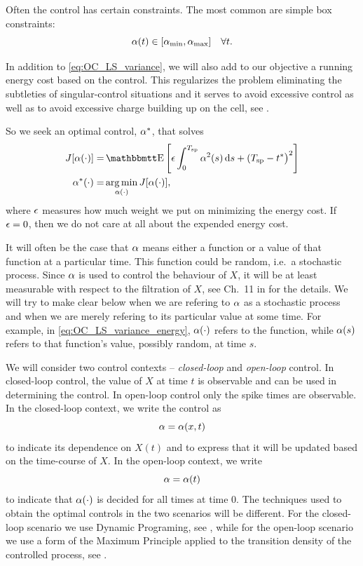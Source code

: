 \documentclass[12pt]{iopart}
\begin{document}
Often the control has certain constraints. The most common are simple box
constraints:
\begin{equation}
{\alpha}(t) \in [{ {\alpha}_{\textrm{min}} }, { {\alpha}_{\textrm{max}} }] \quad \forall t.
\label{eq:bound_constraints_alpha}
\end{equation}

In addition to \cref{eq:OC_LS_variance}, we will also add to our objective a
running energy cost based on the control. This regularizes the problem
eliminating the subtleties of singular-control situations and it serves to avoid excessive
control as well as to avoid excessive charge building up on the cell, see
\cite{Ahmadian2011}. 

So we seek an optimal control, ${\alpha}^*$, that solves
\begin{align}
J[\a(\cdot)] =&
\Exp\left[
\e \int_0^\ts  \a^2(s) \intd{s}
+
(\ts - \T \big)^2 \right]
\label{eq:OC_LS_variance_energy}
\\ \notag
\a^*(\cdot) =& \argmin_{\a(\cdot)} J[\a(\cdot)],
\end{align}
where ${\epsilon}$ measures how much weight we put on minimizing the energy cost.
If ${\epsilon} = 0$, then we do not care at all about the expended energy cost.

It will often be the case that ${\alpha}$ means either a function or a
value of that function at a particular time. This function could be
random, i.e.\ a stochastic process. Since ${\alpha}$ is used to control the behaviour
of $X$, it will be at least measurable with respect to the filtration of $X$,
see Ch.\ 11 in \cite{Oksendal2007} for the details. We will try to make clear
below when we are refering to ${\alpha}$ as a stochastic process and when we are merely refering to its particular
value at some time. For example, in \cref{eq:OC_LS_variance_energy}, ${\alpha}(\cdot)$
refers to the function, while ${\alpha}(s)$ refers to that function's value, possibly
random, at time $s$.

We will consider two control contexts -- {\sl closed-loop} and  {\sl open-loop}
control. In closed-loop control, the value of $X$ at time $t$ is observable
and can be used in determining the control. In open-loop control only the spike
times are observable. In the closed-loop context, we write the control as $${\alpha} =
{\alpha}(x,t)$$ to indicate its dependence on $X(t)$ and to express that it will be
updated based on the time-course of $X$. In the open-loop context, we write $${\alpha}
= {\alpha}(t)$$ to indicate that ${\alpha}(\cdot)$ is decided for all times at time 0. The
techniques used to obtain the optimal controls in the two scenarios will be
different. For the closed-loop scenario we use Dynamic Programing,
see \cite{Fleming1975}, while for the open-loop scenario we use a form of the
Maximum Principle applied to the transition density of the controlled process,
see \cite{Borzi2012}.
\end{document}
